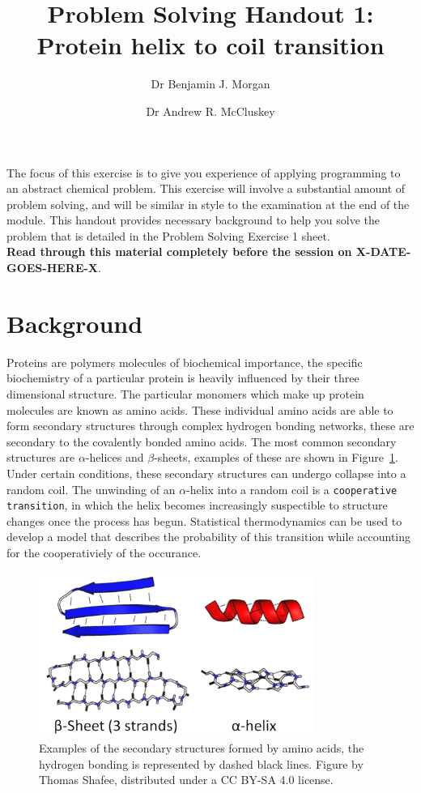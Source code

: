 \documentclass[a4paper]{article}
\title{Problem Solving Handout 1: Protein helix to coil transition}
\author[1]{Dr Benjamin J. Morgan}
\author[1,2]{Dr Andrew R. McCluskey}
\affil[1]{Department of Chemistry, University of Bath, email: b.j.morgan@bath.ac.uk}
\affil[2]{Diamond Light Source, email: andrew.mccluskey@diamond.ac.uk}
\begin{document}
\maketitle

The focus of this exercise is to give you experience of applying programming to an abstract chemical problem. 
This exercise will involve a substantial amount of problem solving, and will be similar in style to the examination at the end of the module. 
This handout provides necessary background to help you solve the problem that is detailed in the Problem Solving Exercise 1 sheet. \\
\linebreak
\textbf{Read through this material completely before the session on X-DATE-GOES-HERE-X}.

\section{Background}

Proteins are polymers molecules of biochemical importance, the specific biochemistry of a particular protein is heavily influenced by their three dimensional structure. 
The particular monomers which make up protein molecules are known as amino acids. 
These individual amino acids are able to form secondary structures through complex hydrogen bonding networks, these are secondary to the covalently bonded amino acids. 
The most common secondary structures are $\alpha$-helices and $\beta$-sheets, examples of these are shown in Figure~\ref{fig:ss}. 
Under certain conditions, these secondary structures can undergo collapse into a random coil. 
The unwinding of an $\alpha$-helix into a random coil is a \texttt{cooperative transition}, in which the helix becomes increasingly suspectible to structure changes once the process has begun. 
Statistical thermodynamics can be used to develop a model that describes the probability of this transition while accounting for the cooperativiely of the occurance. 

\begin{figure}
  \centering
  \includegraphics[width=0.8\textwidth]{secondary_structure}
  \caption{\label{fig:ss} Examples of the secondary structures formed by amino acids, the hydrogen bonding is represented by dashed black lines. Figure by Thomas Shafee, distributed under a CC BY-SA 4.0 license.}
\end{figure}
%
\end{document}
